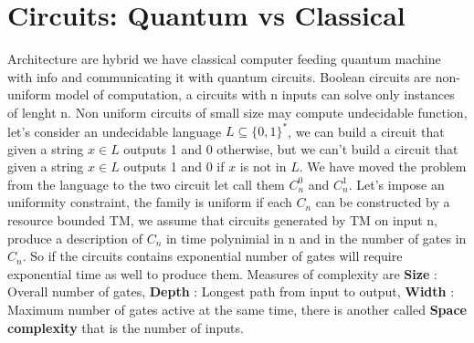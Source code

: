 \documentclass[12pt]{book}
\begin{document}
\section{Circuits: Quantum vs Classical}
Architecture are hybrid we have classical computer feeding quantum machine with info and communicating it with quantum circuits.
Boolean circuits are non-uniform model of computation, a circuits with n inputs can solve only instances of lenght n.
\newline
Non uniform circuits of small size may compute undecidable function, let's consider an undecidable language $L \subseteq \{0,1\}^*$, we can build a circuit that given a string $x \in L$ outputs 1 and 0 otherwise, but we can't build a circuit that given a string $x \in L$ outputs 1 and 0 if $x$ is not in $L$.
We have moved the problem from the language to the two circuit let call them $C^{0}_n$ and $C^{1}_n$. Let's impose an uniformity constraint, the family is uniform if each $C_n$ can be constructed by a resource bounded TM, we assume that circuits generated by TM on input n, produce a description of $C_n$ in time polynimial in n and in the number of gates in $C_n$. So if the circuits contains exponential number of gates will require exponential time as well to produce them.\newline
Measures of complexity are \textbf{Size} : Overall number of gates, \textbf{Depth} : Longest path from input to output, \textbf{Width} : Maximum number of gates active at the same time, there is another called \textbf{Space complexity} that is the number of inputs.
\end{document}
